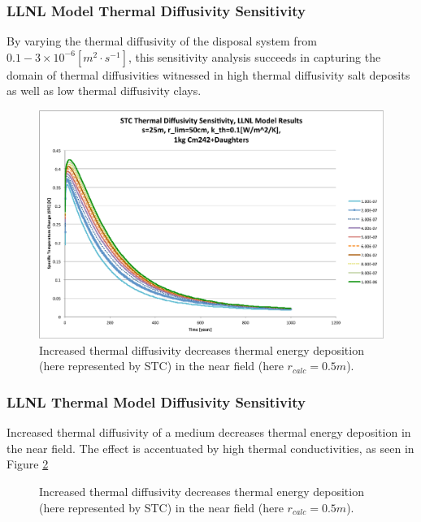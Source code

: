 
\begin{frame}[ctb!]
\frametitle{LLNL Model Thermal Diffusivity Sensitivity}
By varying the thermal diffusivity of the disposal system from $0.1-3\times 
10^{-6} [m^2\cdot s^{-1}]$, this sensitivity analysis succeeds in capturing the domain of 
thermal diffusivities witnessed in high thermal diffusivity salt deposits as 
well as low thermal diffusivity clays.

\begin{figure}[htbp!]
\begin{center}
\includegraphics[height=0.7\textheight]{./thermal_demonstration/diffusivity/Cm242alpha_kth_low.eps}
\end{center}
\caption[$K_{th}$ Sensitivity to $\alpha_{th}$ for $k_{th}$]{Increased thermal diffusivity decreases thermal energy deposition 
(here represented by STC) in the near field (here $r_{calc} = 0.5m$).}
\label{fig:Cm242alpha_kth_low}
\end{figure}
\end{frame}


\begin{frame}[ctb!]
\frametitle{LLNL Thermal Model Diffusivity Sensitivity}
Increased thermal diffusivity of a medium decreases thermal energy 
deposition in the near field. The effect is 
accentuated by high thermal conductivities, as seen in 
Figure \ref{fig:Cm242alpha_kth_high}
\begin{figure}[htbp!]
\begin{center}
\end{center}
\caption[$K_{th}$ Sensitivity for High $\alpha_{th}$]{Increased thermal diffusivity decreases thermal energy deposition 
(here represented by STC) in the near field (here $r_{calc} = 0.5m$).}
\label{fig:Cm242alpha_kth_high}
\end{figure}
\end{frame}

